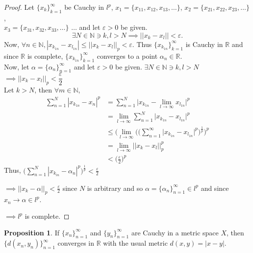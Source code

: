 \documentclass[11pt,a4paper]{article}
\theoremstyle{definition}
\newtheorem{prop}[thm]{Proposition}
\begin{document}
\begin{proof}
Let $\{x_k\}^{\infty}_{k=1}$ be Cauchy in $l^p$, $x_1=\{x_{11},x_{12},x_{13},\dots\}$, $x_2=\{x_{21},x_{22},x_{23},\dots\}$, \\$x_3=\{x_{31},x_{32},x_{33},\dots\}$ $\dots$ and let $\varepsilon>0$ be given. $$\exists N\in \mathbb{N}\ni k,l>N\implies ||x_k-x_l||<\varepsilon.$$ Now, \hspace{0.2cm}$\forall n\in \mathbb{N}, |x_{k_{1n}}-x_{l_{1n}}|\leq ||x_k-x_l||_p<\varepsilon .$ Thus $\{x_{k_{1n}}\}^{\infty}_{k=1}$ is Cauchy in $\mathbb{R}$ and since $\mathbb{R}$ is complete, $\{x_{k_{1n}}\}^{\infty}_{k=1}$ converges to a point $\alpha_n\in \mathbb{R}$.\\ Now, let $\alpha=\{\alpha_n\}^{\infty}_{n=1}$ and let $\varepsilon>0$ be given. $\exists N\in \mathbb{N}\ni k,l>N $ $\implies ||x_k-x_l||_p<\dfrac{\varepsilon}{2}$\\ Let $k>N$, then $\forall m\in \mathbb{N}$,
\begin{align*}
\sum^N_{n=1}|x_{k_{1n}}-x_n|^p &=\sum^N_{n=1}\Big|x_{k_{1n}}-\lim_{l\rightarrow \infty}x_{l_{1n}}\Big|^p\\
                               &=\lim_{l\rightarrow \infty}\sum^N_{n=1}\Big|x_{k_{1n}}-x_{l_{1n}}\Big|^p\\
                               &\leq \Bigg(\lim_{l\rightarrow \infty}\Bigg(\Bigg(\sum^{\infty}_{n=1}\Big|x_{k_{1n}}-x_{l_{1n}}\Big|^p\Bigg)^{\frac{1}{p}}\Bigg)^p\\
                               &=\lim_{l\rightarrow \infty}||x_k-x_l||^p_p\\
                               &<\Big(\frac{\varepsilon}{2}\Big)^p
\end{align*} 
Thus, \hspace{0.3cm}$\displaystyle{\Bigg(\sum^N_{n=1}|x_{k_{in}}-\alpha_n|^p\Bigg)^{\frac{1}{p}}<\frac{\varepsilon}{2}}$

$\implies ||x_k-\alpha||_p<\frac{\varepsilon}{2}$ since $N$ is arbitrary and so $\alpha =\{\alpha_n\}^{\infty}_{n=1}\in l^p$ and since $x_n\rightarrow \alpha \in l^p$.

$\implies l^p$ is complete.


 
 
 \pagebreak
\end{proof}
\begin{prop}
If $\{x_n\}^{\infty}_{n=1}$ and $\{y_n\}^{\infty}_{n=1}$ are Cauchy in a metric space $X$, then $\{d(x_n,y_n)\}^{\infty}_{n=1}$ converges in $\mathbb{R}$ with the usual metric $d(x,y)=|x-y|$.

\end{prop}
\end{document}
